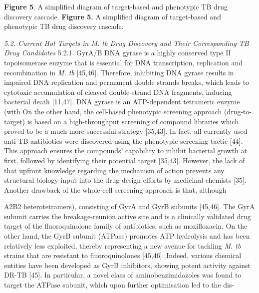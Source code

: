 \documentclass{article}
\begin{document}
\textbf{Figure 5}. A simplified diagram of target-based and phenotypic TB drug discovery cascade. \textbf{Figure 5.} A simplified diagram of target-based and phenotypic TB drug discovery cascade.

\textit{5.2. Current Hot Targets in M. tb Drug Discovery and Their Corresponding TB Drug Candidates}  5.2.1. GyrA/B DNA gyrase is a highly conserved type II topoisomerase enzyme that is essential for DNA transcription, replication and recombination in \textit{M. tb} [45,46]. Therefore, inhibiting DNA gyrase results in impaired DNA replication and permanent double strands breaks, which leads to cytotoxic accumulation of cleaved double-strand DNA fragments, inducing bacterial death [11,47]. DNA gyrase is an ATP-dependent tetrameric enzyme (with On the other hand, the cell-based phenotypic screening approach (drug-to-target) is based on a high-throughput screening of compound libraries which proved to be a much more successful strategy [35,43]. In fact, all currently used anti-TB antibiotics were discovered using the phenotypic screening tactic [44]. This approach ensures the compounds' capability to inhibit bacterial growth at first, followed by identifying their potential target [35,43]. However, the lack of that upfront knowledge regarding the mechanism of action prevents any structural biology input into the drug design efforts by medicinal chemists [35]. Another drawback of the whole-cell screening approach is that, although

A2B2 heterotetramers), consisting of GyrA and GyrB subunits [45,46]. The GyrA subunit carries the breakage-reunion active site and is a clinically validated drug target of the fluoroquinolone family of antibiotics, such as moxifloxacin. On the other hand, the GyrB subunit (ATPase) promotes ATP hydrolysis and has been relatively less exploited, thereby representing a new avenue for tackling \textit{M. tb} strains that are resistant to fluoroquinolones [45,46]. Indeed, various chemical entities have been developed as GyrB inhibitors, showing potent activity against DR-TB [45]. In particular, a novel class of aminobenzimidazoles was found to target the ATPase subunit, which upon further optimisation led to the dis-
\end{document}

